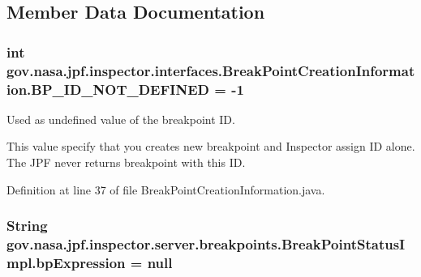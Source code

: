 \subsection{Member Data Documentation}
\subsubsection[{\texorpdfstring{B\+P\+\_\+\+I\+D\+\_\+\+N\+O\+T\+\_\+\+D\+E\+F\+I\+N\+ED}{BP_ID_NOT_DEFINED}}]{\setlength{\rightskip}{0pt plus 5cm}int gov.\+nasa.\+jpf.\+inspector.\+interfaces.\+Break\+Point\+Creation\+Information.\+B\+P\+\_\+\+I\+D\+\_\+\+N\+O\+T\+\_\+\+D\+E\+F\+I\+N\+ED = -\/1\hspace{0.3cm}{\ttfamily [inherited]}}\hypertarget{interfacegov_1_1nasa_1_1jpf_1_1inspector_1_1interfaces_1_1_break_point_creation_information_a24626231e3744e59f505d0731d4ca9e1}{}\label{interfacegov_1_1nasa_1_1jpf_1_1inspector_1_1interfaces_1_1_break_point_creation_information_a24626231e3744e59f505d0731d4ca9e1}


Used as undefined value of the breakpoint ID. 

This value specify that you creates new breakpoint and Inspector assign ID alone. The J\+PF never returns breakpoint with this ID. 

Definition at line 37 of file Break\+Point\+Creation\+Information.\+java.

\subsubsection[{\texorpdfstring{bp\+Expression}{bpExpression}}]{\setlength{\rightskip}{0pt plus 5cm}String gov.\+nasa.\+jpf.\+inspector.\+server.\+breakpoints.\+Break\+Point\+Status\+Impl.\+bp\+Expression = null\hspace{0.3cm}{\ttfamily [private]}}\hypertarget{classgov_1_1nasa_1_1jpf_1_1inspector_1_1server_1_1breakpoints_1_1_break_point_status_impl_a273cbcbe737ba67ac545632a1dad503c}{}\label{classgov_1_1nasa_1_1jpf_1_1inspector_1_1server_1_1breakpoints_1_1_break_point_status_impl_a273cbcbe737ba67ac545632a1dad503c}


